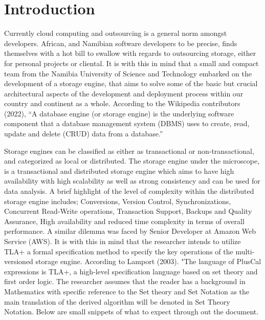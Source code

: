 \documentclass[11pt,a4paper,oneside]{book} %
\numberwithin{equation}{section}
\begin{document}
\section{Introduction}
Currently cloud computing and outsourcing is a general norm amongst developers. African,
and Namibian software developers to be precise, finds themselves with a hot bill to swallow with
regards to outsourcing storage, either for personal projects or cliental. It is with this in mind
that a small and compact team from the Namibia University of Science and
Technology embarked on the development of a storage engine, that aims to solve some of the basic but crucial architectural aspects of the development and deployment process within our country and continent as a whole.
According to the Wikipedia contributors (2022), “A database engine (or storage engine) is the
underlying software component that a database management system (DBMS) uses to create,
read, update and delete (CRUD) data from a database.” 

\setlength{\parskip}{10pt}

Storage engines can be classified as
either as transactional or non-transactional, and categorized as local or distributed. The storage engine under the microscope, is a transactional and distributed storage engine which aims to have high availability with high scalability as well as strong consistency and can be used for data analysis. A brief highlight of the level of complexity within the distributed storage engine includes; Conversions, Version Control, Synchronizations, Concurrent Read-Write operations, Transaction Support, Backups and Quality Assurance, High availability and reduced time complexity in terms of overall performance. A similar dilemma was faced by Senior Developer
at Amazon Web Service (AWS). It is with this in mind that the researcher intends to utilize TLA+ a formal specification method to specify the key operations of the multi-versioned storage engine.  According to Lamport (2003). "The language of PlusCal expressions is TLA+, a high-level specification language based on set theory and first order logic.
The researcher assumes that the reader has a background in Mathematics with specific reference to the Set theory and Set Notation as the main translation of the derived algorithm will be denoted in Set Theory Notation. Below are small snippets of what to expect through out the document.
\end{document}
